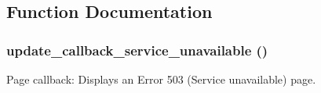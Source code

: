 \subsection{Function Documentation}
\hypertarget{update__test_8module_ad70dd907c5b546384b07f9e582764151}{
\subsubsection[{update\_\-callback\_\-service\_\-unavailable}]{\setlength{\rightskip}{0pt plus 5cm}update\_\-callback\_\-service\_\-unavailable ()}}
\label{update__test_8module_ad70dd907c5b546384b07f9e582764151}
Page callback: Displays an Error 503 (Service unavailable) page.

